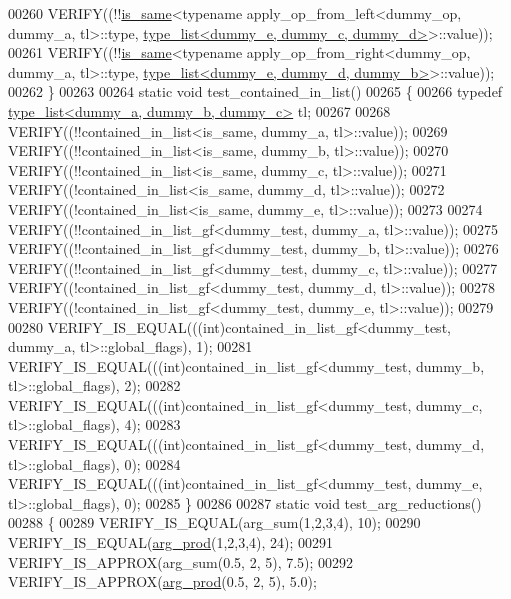 \begin{DoxyCode}
00260   VERIFY((!!\hyperlink{struct_eigen_1_1internal_1_1is__same}{is\_same}<\textcolor{keyword}{typename} apply\_op\_from\_left<dummy\_op, dummy\_a, tl>::type, 
      \hyperlink{struct_eigen_1_1internal_1_1type__list}{type\_list<dummy\_e, dummy\_c, dummy\_d>}>::value));
00261   VERIFY((!!\hyperlink{struct_eigen_1_1internal_1_1is__same}{is\_same}<\textcolor{keyword}{typename} apply\_op\_from\_right<dummy\_op, dummy\_a, tl>::type, 
      \hyperlink{struct_eigen_1_1internal_1_1type__list}{type\_list<dummy\_e, dummy\_d, dummy\_b>}>::value));
00262 \}
00263 
00264 \textcolor{keyword}{static} \textcolor{keywordtype}{void} test\_contained\_in\_list()
00265 \{
00266   \textcolor{keyword}{typedef} \hyperlink{struct_eigen_1_1internal_1_1type__list}{type\_list<dummy\_a, dummy\_b, dummy\_c>} tl;
00267 
00268   VERIFY((!!contained\_in\_list<is\_same, dummy\_a, tl>::value));
00269   VERIFY((!!contained\_in\_list<is\_same, dummy\_b, tl>::value));
00270   VERIFY((!!contained\_in\_list<is\_same, dummy\_c, tl>::value));
00271   VERIFY((!contained\_in\_list<is\_same, dummy\_d, tl>::value));
00272   VERIFY((!contained\_in\_list<is\_same, dummy\_e, tl>::value));
00273 
00274   VERIFY((!!contained\_in\_list\_gf<dummy\_test, dummy\_a, tl>::value));
00275   VERIFY((!!contained\_in\_list\_gf<dummy\_test, dummy\_b, tl>::value));
00276   VERIFY((!!contained\_in\_list\_gf<dummy\_test, dummy\_c, tl>::value));
00277   VERIFY((!contained\_in\_list\_gf<dummy\_test, dummy\_d, tl>::value));
00278   VERIFY((!contained\_in\_list\_gf<dummy\_test, dummy\_e, tl>::value));
00279 
00280   VERIFY\_IS\_EQUAL(((\textcolor{keywordtype}{int})contained\_in\_list\_gf<dummy\_test, dummy\_a, tl>::global\_flags), 1);
00281   VERIFY\_IS\_EQUAL(((\textcolor{keywordtype}{int})contained\_in\_list\_gf<dummy\_test, dummy\_b, tl>::global\_flags), 2);
00282   VERIFY\_IS\_EQUAL(((\textcolor{keywordtype}{int})contained\_in\_list\_gf<dummy\_test, dummy\_c, tl>::global\_flags), 4);
00283   VERIFY\_IS\_EQUAL(((\textcolor{keywordtype}{int})contained\_in\_list\_gf<dummy\_test, dummy\_d, tl>::global\_flags), 0);
00284   VERIFY\_IS\_EQUAL(((\textcolor{keywordtype}{int})contained\_in\_list\_gf<dummy\_test, dummy\_e, tl>::global\_flags), 0);
00285 \}
00286 
00287 \textcolor{keyword}{static} \textcolor{keywordtype}{void} test\_arg\_reductions()
00288 \{
00289   VERIFY\_IS\_EQUAL(arg\_sum(1,2,3,4), 10);
00290   VERIFY\_IS\_EQUAL(\hyperlink{struct_eigen_1_1internal_1_1arg__prod}{arg\_prod}(1,2,3,4), 24);
00291   VERIFY\_IS\_APPROX(arg\_sum(0.5, 2, 5), 7.5);
00292   VERIFY\_IS\_APPROX(\hyperlink{struct_eigen_1_1internal_1_1arg__prod}{arg\_prod}(0.5, 2, 5), 5.0);

\end{DoxyCode}
